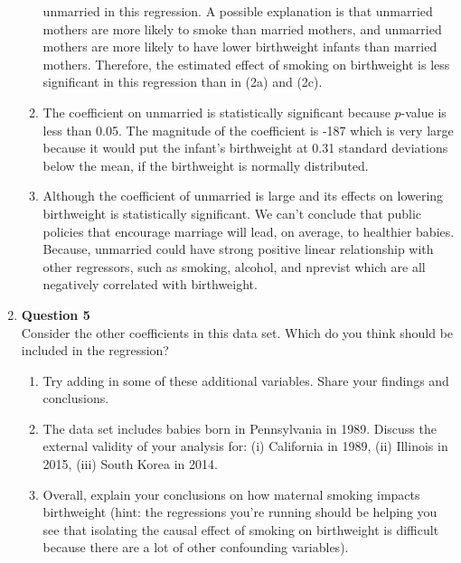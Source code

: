 \documentclass{uofa-eng-assignment}
\begin{document}
\begin{enumerate}
\begin{enumerate}
                  unmarried in this regression. A possible explanation is that unmarried mothers
                  are more likely to smoke than married mothers, and unmarried mothers are more
                  likely to have lower birthweight infants than married mothers. Therefore, the
                  estimated effect of smoking on birthweight is less significant in this
                  regression than in (2a) and (2c).
            \item The coefficient on unmarried is statistically significant because $p$-value is
                  less than 0.05. The magnitude of the coefficient is -187 which is very large
                  because it would put the infant's birthweight at 0.31 standard deviations below
                  the mean, if the birthweight is normally distributed.
            \item Although the coefficient of unmarried is large and its effects on lowering
                  birthweight is statistically significant. We can't conclude that public
                  policies that encourage marriage will lead, on average, to healthier babies.
                  Because, unmarried could have strong positive linear relationship with other
                  regressors, such as smoking, alcohol, and nprevist which are all negatively
                  correlated with birthweight.
        \end{enumerate} \newpage
    \item[] \textbf{Question 5} \\
        Consider the other coefficients in this data set. Which do you think should be included in the
        regression?
        \begin{enumerate}
            \item Try adding in some of these additional variables. Share your findings and
                  conclusions.
            \item The data set includes babies born in Pennsylvania in 1989. Discuss the external
                  validity of your analysis for: (i) California in 1989, (ii) Illinois in 2015,
                  (iii) South Korea in 2014.
            \item Overall, explain your conclusions on how maternal smoking impacts birthweight
                  (hint: the regressions you’re running should be helping you see that isolating
                  the causal effect of smoking on birthweight is difficult because there are a
                  lot of other confounding variables).
        \end{enumerate}

\end{enumerate}
\end{document}
